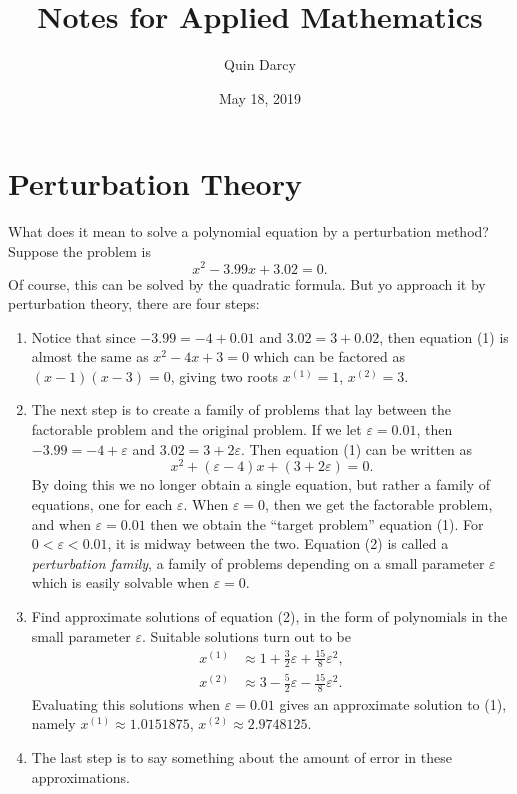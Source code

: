 \documentclass{article}
\theoremstyle{definition}
\theoremstyle{remark}
\theoremstyle{definition}
\begin{document}
\title{Notes for Applied Mathematics}
\author{Quin Darcy}
\date{May 18, 2019}
\maketitle

\section{Perturbation Theory}
    What does it mean to solve a polynomial equation by a perturbation method? Suppose the problem is
        \begin{equation}
            x^2-3.99x+3.02=0.
        \end{equation}
    \noindent Of course, this can be solved by the quadratic formula. But yo approach it by perturbation theory, there are four steps:
        \begin{enumerate}
            \item Notice that since $-3.99=-4+0.01$ and $3.02=3+0.02$, then equation (1) is almost the same as $x^2-4x+3=0$ which can be factored as $(x-1)(x-3)=0$, giving two roots $x^{(1)}=1$, $x^{(2)}=3$.
            \item The next step is to create a family of problems that lay between the factorable problem and the original problem. If we let $\varepsilon=0.01$, then $-3.99=-4+\varepsilon$ and $3.02=3+2\varepsilon$. Then equation (1) can be written as 
                \begin{equation}
                    x^2+(\varepsilon-4)x+(3+2\varepsilon)=0.
                \end{equation}
            By doing this we no longer obtain a single equation, but rather a family of equations, one for each $\varepsilon$. When $\varepsilon=0$, then we get the factorable problem, and when $\varepsilon=0.01$ then we obtain the ``target problem'' equation (1). For $0<\varepsilon<0.01$, it is midway between the two. Equation (2) is called a \textit{perturbation family}, a family of problems depending on a small parameter $\varepsilon$ which is easily solvable when $\varepsilon=0$.
            \item Find approximate solutions of equation (2), in the form of polynomials in the small parameter $\varepsilon$. Suitable solutions turn out to be 
                \begin{equation*}
                    \begin{split}
                        x^{(1)}&\approx 1+\frac{3}{2}\varepsilon+\frac{15}{8}\varepsilon^2, \\
                        x^{(2)}&\approx 3-\frac{5}{2}\varepsilon-\frac{15}{8}\varepsilon^2.
                    \end{split}
                \end{equation*}
            Evaluating this solutions when $\varepsilon=0.01$ gives an approximate solution to (1), namely $x^{(1)}\approx 1.0151875$, $x^{(2)}\approx 2.9748125$.
            \item The last step is to say something about the amount of error in these approximations.
        \end{enumerate}
    
\end{document}
